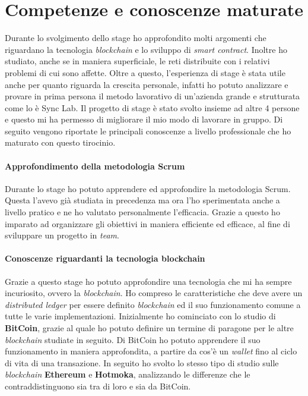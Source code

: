 
\section{Competenze e conoscenze maturate}
Durante lo svolgimento dello stage ho approfondito molti argomenti che riguardano la tecnologia \textit{blockchain} e lo sviluppo di \textit{smart contract}. Inoltre ho studiato, anche se in maniera superficiale, le reti distribuite con i relativi problemi di cui sono affette.
Oltre a questo, l'esperienza di stage è stata utile anche per quanto riguarda la crescita personale, infatti ho potuto analizzare e provare in prima persona il metodo lavorativo di un'azienda grande e strutturata come lo è Sync Lab. Il progetto di stage è stato svolto insieme ad altre 4 persone e questo mi ha permesso di migliorare il mio modo di lavorare in gruppo. 
Di seguito vengono riportate le principali conoscenze a livello professionale che ho maturato con questo tirocinio. 

\paragraph{Approfondimento della metodologia Scrum}
Durante lo stage ho potuto apprendere ed approfondire la metodologia Scrum. Questa l'avevo già studiata in precedenza ma ora l'ho sperimentata anche a livello pratico e ne ho valutato personalmente l'efficacia. Grazie a questo ho imparato ad organizzare gli obiettivi in maniera efficiente ed efficace, al fine di sviluppare un progetto in \textit{team}.

\paragraph{Conoscenze riguardanti la tecnologia blockchain} 
Grazie a questo stage ho potuto approfondire una tecnologia che mi ha sempre incuriosito, ovvero la \textit{blockchain}. Ho compreso le caratteristiche che deve avere un \textit{distributed ledger} per essere definito \textit{blockchain} ed il suo funzionamento comune a tutte le varie implementazioni. 
Inizialmente ho cominciato con lo studio di \textbf{BitCoin}, grazie al quale ho potuto definire un termine di paragone per le altre \textit{blockchain} studiate in seguito. Di BitCoin ho potuto apprendere il suo funzionamento in maniera approfondita, a partire da cos'è un \textit{wallet} fino al ciclo di vita di una transazione. In seguito ho svolto lo stesso tipo di studio sulle \textit{blockchain} \textbf{Ethereum} e \textbf{Hotmoka}, analizzando le differenze che le contraddistinguono sia tra di loro e sia da BitCoin. \\

